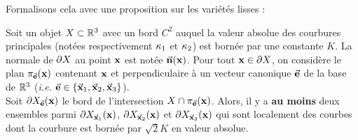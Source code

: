 Formalisons cela avec une proposition sur les variétés lisses :
%
\begin{proposition}
\label{prop:slices-3d}
  Soit un objet $X \subset \mathbb{R}^3$ avec un bord $C^2$ auquel la valeur
  absolue des courbures principales (notées respectivement $\kappa_{1}$ et
  $\kappa_{2}$) est bornée par une constante $K$. La normale de $\partial X$ au
  point $\mathbf{x}$ est notée $\vec{\mathbf{n}}(\mathbf{x})$. Pour tout $\mathbf{x} \in \partial X$, on
  considère le plan $\pi_{\vec{\mathbf{e}}}(\mathbf{x})$ contenant $\mathbf{x}$ et perpendiculaire à
  un vecteur canonique $\vec{\mathbf{e}}$ de la base de $\mathbb{R}^3$ (\emph{i.e.}
  $\vec{\mathbf{e}}\in\{ \vec{\mathbf{x}}_1, \vec{\mathbf{x}}_2, \vec{\mathbf{x}}_3 \}$).
  \\
  Soit $\partial X_{\vec{\mathbf{e}}}(\mathbf{x})$ le bord de l'intersection $X
  \cap \pi_{\vec{\mathbf{e}}}(\mathbf{x})$. Alors, il y a \textbf{au moins} deux ensembles parmi
  $\partial X_{\vec{\mathbf{x}}_1}(\mathbf{x})$, $\partial X_{\vec{\mathbf{x}}_2}(\mathbf{x})$ et
  $\partial X_{\vec{\mathbf{x}}_3}(\mathbf{x})$ qui sont localement des courbes dont la
  courbure est bornée par $\sqrt{2}K$ en valeur absolue.
\end{proposition}
